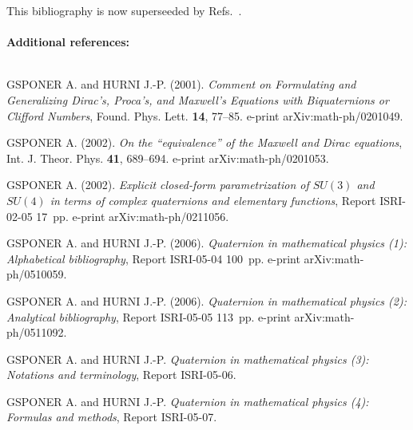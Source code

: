 \documentclass [12pt,a4paper      ]{article}
\begin{document}
\begin{enumerate}
This bibliography is now superseeded by Refs.~\cite{GSPON2005D,GSPON2005E}.\\


~~\\ {\bf Additional references:} 

~~\\

 GSPONER A. and HURNI J.-P. (2001). \emph{Comment on Formulating and Generalizing Dirac's, Proca's, and Maxwell's Equations with Biquaternions or Clifford Numbers}, Found. Phys. Lett. {\bf 14}, 77--85. e-print arXiv:math-ph/0201049. 
 
 GSPONER A. (2002). \emph{On the ``equivalence'' of the Maxwell and Dirac equations}, Int. J. Theor. Phys. {\bf 41}, 689--694. e-print arXiv:math-ph/0201053.

 GSPONER A. (2002). \emph{Explicit closed-form parametrization of $SU(3)$ and $SU(4)$ in terms of complex quaternions and elementary functions}, Report ISRI-02-05  17~pp.  e-print arXiv:math-ph/0211056.

 GSPONER A. and HURNI J.-P.  (2006). \emph{Quaternion in mathematical physics (1): Alphabetical bibliography}, Report ISRI-05-04 100~pp.  e-print arXiv:math-ph/0510059.

 GSPONER A. and HURNI J.-P. (2006). \emph{Quaternion in mathematical physics (2): Analytical bibliography}, Report ISRI-05-05 113~pp.  e-print arXiv:math-ph/0511092.

 GSPONER A. and HURNI J.-P. \emph{Quaternion in mathematical physics (3): Notations and terminology}, Report ISRI-05-06.

 GSPONER A. and HURNI J.-P. \emph{Quaternion in mathematical physics (4): Formulas and methods}, Report ISRI-05-07.


\end{enumerate}
\end{document}
